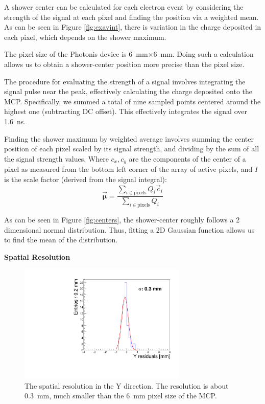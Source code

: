 \documentclass[twocolumn]{article}
\begin{document}
A shower center can be calculated for each electron event by considering the strength of the signal at each pixel and finding the position via a weighted mean. As can be seen in Figure \ref{fig:exavint}, there is variation in the charge deposited in each pixel, which depends on the shower maximum.

The pixel size of the Photonis device is \SI{6}{\milli\meter}$\times$\SI{6}{\milli\meter}. Doing such a calculation allows us to obtain a shower-center position more precise than the pixel size.

The procedure for evaluating the strength of a signal involves integrating the signal pulse near the peak, effectively calculating the charge deposited onto the MCP. Specifically, we summed a total of nine sampled points centered around the highest one (subtracting DC offset). This effectively integrates the signal over \SI{1.6}{\nano\second}.

Finding the shower maximum by weighted average involves summing the center position of each pixel scaled by its signal strength, and dividing by the sum of all the signal strength values. Where $c_x,c_y$ are the components of the center of a pixel as measured from the bottom left corner of the array of active pixels, and $I$ is the scale factor (derived from the signal integral):
\[
\vec{\mathbf{{\mu}}} =
\frac{\sum_{i\in\text{pixels}} Q_i \vec{c}_i}
{\sum_{i\in\text{pixels}} Q_i}
\]

As can be seen in Figure \ref{fig:centers}, the shower-center roughly follows a 2 dimensional normal distribution. Thus, fitting a 2D Gaussian function allows us to find the mean of the distribution.

\title{\large}{\textbf{Spatial Resolution}}

\begin{figure}[htbp]
	\centering
	\includegraphics[width=8cm]{Images/sres/sres_cutoff.pdf}
	\caption{\small The spatial resolution in the Y direction. The resolution is about \SI{0.3}{\milli\meter}, much smaller than the \SI{6}{\milli\meter} pixel size of the MCP.}
	\label{fig:sres}
\end{figure}
\end{document}
